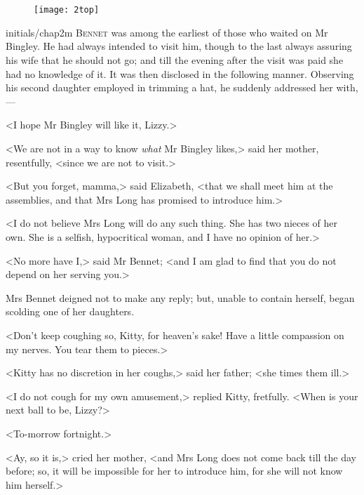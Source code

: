 
 \chapter[Chapter \thechapter]{}

\begin{figure}[t!]
\centering
\texttt{[image: 2top]}
\end{figure}

 \lettrine[lines=6,image=true,findent=5pt]{initials/chap2m}{ Bennet} was among the earliest of those who waited on Mr Bingley. He had always intended to visit him, though to the last always assuring his wife that he should not go; and till the evening after the visit was paid she had no knowledge of it. It was then disclosed in the following manner. Observing his second daughter employed in trimming a hat, he suddenly addressed her with,—

<I hope Mr Bingley will like it, Lizzy.>

<We are not in a way to know \textit{what} Mr Bingley likes,> said her mother, resentfully, <since we are not to visit.>

<But you forget, mamma,> said Elizabeth, <that we shall meet him at the assemblies, and that Mrs Long has promised to introduce him.>

<I do not believe Mrs Long will do any such thing. She has two nieces of her own. She is a selfish, hypocritical woman, and I have no opinion of her.>

<No more have I,> said Mr Bennet; <and I am glad to find that you do not depend on her serving you.>

Mrs Bennet deigned not to make any reply; but, unable to contain herself, began scolding one of her daughters.

<Don't keep coughing so, Kitty, for heaven's sake! Have a little compassion on my nerves. You tear them to pieces.>

<Kitty has no discretion in her coughs,> said her father; <she times them ill.>

<I do not cough for my own amusement,> replied Kitty, fretfully. <When is your next ball to be, Lizzy?>

<To-morrow fortnight.>

<Ay, so it is,> cried her mother, <and Mrs Long does not come back till the day before; so, it will be impossible for her to introduce him, for she will not know him herself.>

